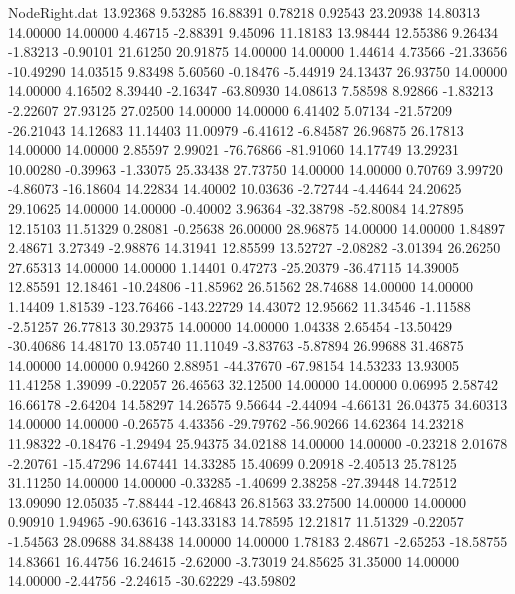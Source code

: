 \begin{filecontents}{NodeRight.dat}
  13.92368    9.53285   16.88391     0.78218    0.92543   23.20938   14.80313   14.00000   14.00000    4.46715   -2.88391    9.45096   11.18183
  13.98444   12.55386    9.26434    -1.83213   -0.90101   21.61250   20.91875   14.00000   14.00000    1.44614    4.73566  -21.33656  -10.49290
  14.03515    9.83498    5.60560    -0.18476   -5.44919   24.13437   26.93750   14.00000   14.00000    4.16502    8.39440   -2.16347  -63.80930
  14.08613    7.58598    8.92866    -1.83213   -2.22607   27.93125   27.02500   14.00000   14.00000    6.41402    5.07134  -21.57209  -26.21043
  14.12683   11.14403   11.00979    -6.41612   -6.84587   26.96875   26.17813   14.00000   14.00000    2.85597    2.99021  -76.76866  -81.91060
  14.17749   13.29231   10.00280    -0.39963   -1.33075   25.33438   27.73750   14.00000   14.00000    0.70769    3.99720   -4.86073  -16.18604
  14.22834   14.40002   10.03636    -2.72744   -4.44644   24.20625   29.10625   14.00000   14.00000   -0.40002    3.96364  -32.38798  -52.80084
  14.27895   12.15103   11.51329     0.28081   -0.25638   26.00000   28.96875   14.00000   14.00000    1.84897    2.48671    3.27349   -2.98876
  14.31941   12.85599   13.52727    -2.08282   -3.01394   26.26250   27.65313   14.00000   14.00000    1.14401    0.47273  -25.20379  -36.47115
  14.39005   12.85591   12.18461   -10.24806  -11.85962   26.51562   28.74688   14.00000   14.00000    1.14409    1.81539 -123.76466 -143.22729
  14.43072   12.95662   11.34546    -1.11588   -2.51257   26.77813   30.29375   14.00000   14.00000    1.04338    2.65454  -13.50429  -30.40686
  14.48170   13.05740   11.11049    -3.83763   -5.87894   26.99688   31.46875   14.00000   14.00000    0.94260    2.88951  -44.37670  -67.98154
  14.53233   13.93005   11.41258     1.39099   -0.22057   26.46563   32.12500   14.00000   14.00000    0.06995    2.58742   16.66178   -2.64204
  14.58297   14.26575    9.56644    -2.44094   -4.66131   26.04375   34.60313   14.00000   14.00000   -0.26575    4.43356  -29.79762  -56.90266
  14.62364   14.23218   11.98322    -0.18476   -1.29494   25.94375   34.02188   14.00000   14.00000   -0.23218    2.01678   -2.20761  -15.47296
  14.67441   14.33285   15.40699     0.20918   -2.40513   25.78125   31.11250   14.00000   14.00000   -0.33285   -1.40699    2.38258  -27.39448
  14.72512   13.09090   12.05035    -7.88444  -12.46843   26.81563   33.27500   14.00000   14.00000    0.90910    1.94965  -90.63616 -143.33183
  14.78595   12.21817   11.51329    -0.22057   -1.54563   28.09688   34.88438   14.00000   14.00000    1.78183    2.48671   -2.65253  -18.58755
  14.83661   16.44756   16.24615    -2.62000   -3.73019   24.85625   31.35000   14.00000   14.00000   -2.44756   -2.24615  -30.62229  -43.59802

\end{filecontents}
